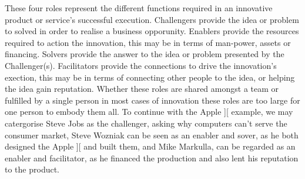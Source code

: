 These four roles represent the different functions required in an innovative product or service's successful execution. Challengers provide the idea or problem to solved in order to realise a business opporunity. Enablers provide the resources required to action the innovation, this may be in terms of man-power, assets or financing. Solvers provide the answer to the idea or problem presented by the Challenger(s). Facilitators provide the connections to drive the innovation's exection, this may be in terms of connecting other people to the idea, or helping the idea gain reputation. Whether these roles are shared amongst a team or fulfilled by a single person in most cases of innovation these roles are too large for one person to embody them all. To continue with the Apple ][ example, we may catergorise Steve Jobs as the challenger, asking why computers can't serve the consumer market, Steve Wozniak can be seen as an enabler and sover, as he both designed the Apple ][ and built them, and Mike Markulla, can be regarded as an enabler and facilitator, as he financed the production and also lent his reputation to the product. 

